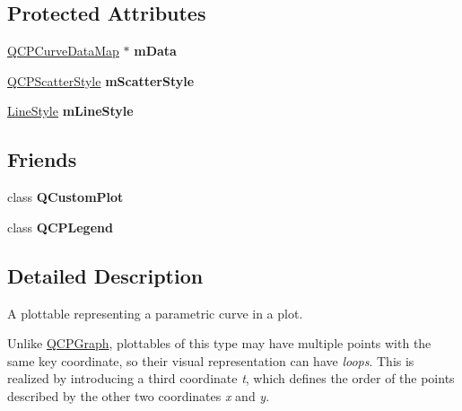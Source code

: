 \subsection*{\-Protected \-Attributes}
\begin{DoxyCompactItemize}
\item 
\hypertarget{classQCPCurve_a88d533e455bca96004b049e99168731b}{\hyperlink{qcustomplot_8h_a444d37ec9cb2951b3a7fe443c34d1658}{\-Q\-C\-P\-Curve\-Data\-Map} $\ast$ {\bfseries m\-Data}}\label{classQCPCurve_a88d533e455bca96004b049e99168731b}

\item 
\hypertarget{classQCPCurve_a08f803b4a30b01bbd7a1eab15d0f864f}{\hyperlink{classQCPScatterStyle}{\-Q\-C\-P\-Scatter\-Style} {\bfseries m\-Scatter\-Style}}\label{classQCPCurve_a08f803b4a30b01bbd7a1eab15d0f864f}

\item 
\hypertarget{classQCPCurve_ae1f35ae2b15aee8e15bcdfec5be95156}{\hyperlink{classQCPCurve_a2710e9f79302152cff794c6e16cc01f1}{\-Line\-Style} {\bfseries m\-Line\-Style}}\label{classQCPCurve_ae1f35ae2b15aee8e15bcdfec5be95156}

\end{DoxyCompactItemize}
\subsection*{\-Friends}
\begin{DoxyCompactItemize}
\item 
\hypertarget{classQCPCurve_a1cdf9df76adcfae45261690aa0ca2198}{class {\bfseries \-Q\-Custom\-Plot}}\label{classQCPCurve_a1cdf9df76adcfae45261690aa0ca2198}

\item 
\hypertarget{classQCPCurve_a8429035e7adfbd7f05805a6530ad5e3b}{class {\bfseries \-Q\-C\-P\-Legend}}\label{classQCPCurve_a8429035e7adfbd7f05805a6530ad5e3b}

\end{DoxyCompactItemize}


\subsection{\-Detailed \-Description}
\-A plottable representing a parametric curve in a plot. 



\-Unlike \hyperlink{classQCPGraph}{\-Q\-C\-P\-Graph}, plottables of this type may have multiple points with the same key coordinate, so their visual representation can have {\itshape loops\/}. \-This is realized by introducing a third coordinate {\itshape t\/}, which defines the order of the points described by the other two coordinates {\itshape x\/} and {\itshape y\/}.

